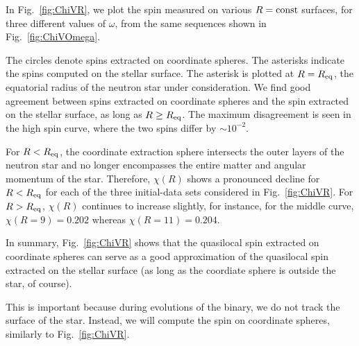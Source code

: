 In Fig.~\ref{fig:ChiVR}, we plot the spin measured on various $R=\rm{const}$
surfaces, for three different values of $\omega$, from the same sequences
shown in Fig.~\ref{fig:ChiVOmega}.

The circles denote spins extracted on coordinate spheres. The asterisks
indicate the spins computed on the stellar surface. The asterisk is
plotted at $R=R_{\rm eq}$, the equatorial radius of the neutron star
under consideration. 
We find good agreement between spins extracted on coordinate spheres and
the spin extracted on the stellar surface, as long as $R\ge R_{\rm eq}$. 
 The maximum disagreement is seen in the high spin curve, where
the two spins differ by $\sim 10^{-2}$. 

For $R<R_{\rm eq}$, the coordinate extraction sphere intersects the
outer layers of the neutron star and no longer encompasses the entire matter and angular
momentum of the star. Therefore, $\chi(R)$ shows a pronounced decline
for $R<R_{\rm eq}$ for each of the three initial-data sets considered
in Fig.~\ref{fig:ChiVR}. For $R>R_{\rm eq}$, $\chi(R)$ continues to
increase slightly, for instance, for the middle curve,
$\chi(R=9)=0.202$ whereas $\chi(R=11)=0.204$.

In summary, Fig.~\ref{fig:ChiVR} shows that the quasilocal spin
extracted on coordinate spheres can serve as a good approximation of
the quasilocal spin extracted on the stellar surface (as long as the
coordiate sphere is outside the star, of course).

This is important because during evolutions of the
binary, we do not track the surface of the star.
Instead, we will compute the spin on coordinate spheres, similarly to Fig.~\ref{fig:ChiVR}.

